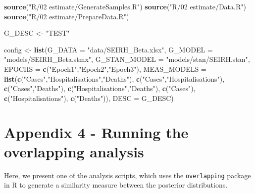 \documentclass[10pt,letterpaper]{article}
\newenvironment{Shaded}{\begin{snugshade}}{\end{snugshade}}
\newcommand{\AttributeTok}[1]{\textcolor[rgb]{0.13,0.29,0.53}{#1}}
\newcommand{\FunctionTok}[1]{\textcolor[rgb]{0.13,0.29,0.53}{\textbf{#1}}}
\newcommand{\NormalTok}[1]{#1}
\newcommand{\OtherTok}[1]{\textcolor[rgb]{0.56,0.35,0.01}{#1}}
\newcommand{\StringTok}[1]{\textcolor[rgb]{0.31,0.60,0.02}{#1}}
\begin{document}
\begin{Shaded}
\begin{Highlighting}[]
\FunctionTok{source}\NormalTok{(}\StringTok{"R/02 estimate/GenerateSamples.R"}\NormalTok{)}
\FunctionTok{source}\NormalTok{(}\StringTok{"R/02 estimate/Data.R"}\NormalTok{)}
\FunctionTok{source}\NormalTok{(}\StringTok{"R/02 estimate/PrepareData.R"}\NormalTok{)}

\NormalTok{G\_DESC }\OtherTok{\textless{}{-}} \StringTok{"TEST"}


\NormalTok{config }\OtherTok{\textless{}{-}} \FunctionTok{list}\NormalTok{(}\AttributeTok{G\_DATA        =} \StringTok{"data/SEIRH\_Beta.xlsx"}\NormalTok{,}
               \AttributeTok{G\_MODEL       =} \StringTok{"models/SEIRH\_Beta.stmx"}\NormalTok{,}
               \AttributeTok{G\_STAN\_MODEL  =} \StringTok{"models/stan/SEIRH.stan"}\NormalTok{,}
               \AttributeTok{EPOCHS        =} \FunctionTok{c}\NormalTok{(}\StringTok{"Epoch1"}\NormalTok{,}\StringTok{"Epoch2"}\NormalTok{,}\StringTok{"Epoch3"}\NormalTok{),}
               \AttributeTok{MEAS\_MODELS   =} \FunctionTok{list}\NormalTok{(}\FunctionTok{c}\NormalTok{(}\StringTok{"Cases"}\NormalTok{,}\StringTok{"Hospitalisations"}\NormalTok{,}\StringTok{"Deaths"}\NormalTok{),}
                                    \FunctionTok{c}\NormalTok{(}\StringTok{"Cases"}\NormalTok{,}\StringTok{"Hospitalisations"}\NormalTok{),}
                                    \FunctionTok{c}\NormalTok{(}\StringTok{"Cases"}\NormalTok{,}\StringTok{"Deaths"}\NormalTok{),}
                                    \FunctionTok{c}\NormalTok{(}\StringTok{"Hospitalisations"}\NormalTok{,}\StringTok{"Deaths"}\NormalTok{),}
                                    \FunctionTok{c}\NormalTok{(}\StringTok{"Cases"}\NormalTok{),}
                                    \FunctionTok{c}\NormalTok{(}\StringTok{"Hospitalisations"}\NormalTok{),}
                                    \FunctionTok{c}\NormalTok{(}\StringTok{"Deaths"}\NormalTok{)),}
               \AttributeTok{DESC          =}\NormalTok{ G\_DESC)}
\end{Highlighting}
\end{Shaded}

\hypertarget{appendix-4---running-the-overlapping-analysis}{%
\section{Appendix 4 - Running the overlapping analysis}\label{appendix-4---running-the-overlapping-analysis}}

Here, we present one of the analysis scripts, which uses the \texttt{overlapping} package in R to generate a similarity measure between the posterior distributions.
\end{document}
